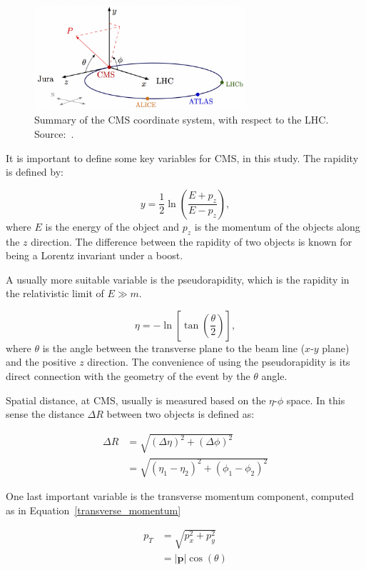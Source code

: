 \begin{figure}[htbp]
    \centering
    \includegraphics[width=0.7\textwidth]{figures_and_tables/experimental_setup/cms_coordinate_system.png}
    \caption{Summary of the CMS coordinate system, with respect to the LHC. Source:~\cite{cms_coordinate_system}.}
    \label{cms_coordinate_system}
\end{figure}

It is important to define some key variables for CMS, in this study. The rapidity is defined by:

\begin{equation}
    y=\frac{1}{2} \ln \left( \frac{E+p_z}{E-p_z} \right),
    \label{rapidity}
\end{equation}
where $E$ is the energy of the object and $p_z$ is the momentum of the objects along the $z$ direction. The difference between the rapidity of two objects is known for being a Lorentz invariant under a boost.

A usually more suitable variable is the pseudorapidity, which is the rapidity in the relativistic limit of $E \gg m$.

\begin{equation}
    \eta = - \ln \left [ \tan \left( \frac{\theta}{2} \right)\right],
    \label{pseudorapidity}
\end{equation}
where $\theta$ is the angle between the transverse plane to the beam line ($x$-$y$ plane) and the positive $z$ direction. The convenience of using the pseudorapidity is its direct connection with the geometry of the event by the $\theta$ angle.

Spatial distance, at CMS, usually is measured based on the $\eta$-$\phi$ space. In this sense the distance $\Delta R$ between two objects is defined as:

\begin{equation}
    \begin{split}
        \Delta R &= \sqrt{(\Delta \eta)^2+(\Delta \phi)^2} \\
        & =\sqrt{(\eta_1 - \eta_2)^2+(\phi_1 - \phi_2)^2}
    \end{split}
    \label{delta_R}
\end{equation}

One last important variable is the transverse momentum component, computed as in Equation~\ref{transverse_momentum}

\begin{equation}
    \begin{split}
        p_T &= \sqrt{p_x^2 + p_y^2} \\
        & =|\mathbf{p}| \cos(\theta)
    \end{split}
    \label{transverse_momentum}
\end{equation}